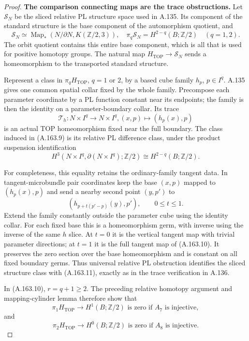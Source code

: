 \begin{proof}
\textbf{The comparison connecting maps are the trace obstructions.}
Let $\mathcal S_N$ be the sliced relative PL structure space used in
A.135. Its component of the standard structure is the base component
of the automorphism quotient, and
\[
 \mathcal S_N\simeq
 \operatorname{Map}_*(N/\partial N,K(\mathbb Z/2,3)),
 \quad \pi_q\mathcal S_N=H^{2-q}(B;\mathbb Z/2)
 \quad(q=1,2).                                                     \tag{A.163.9}
\]
The orbit quotient contains this entire base component, which is all
that is used for positive homotopy groups. The natural map
$H_{\mathrm{TOP}}\to\mathcal S_N$ sends a homeomorphism to the
transported standard structure.

Represent a class in $\pi_qH_{\mathrm{TOP}}$, $q=1$ or $2$, by a based
cube family $h_p$, $p\in I^q$. A.135 gives one common spatial collar
fixed by the whole family. Precompose each parameter coordinate by
a PL function constant near its endpoints; the family is then the
identity on a parameter-boundary collar. Its trace
\[
 \mathcal T_h:N\times I^q\longrightarrow N\times I^q,
                 (x,p)\longmapsto(h_p(x),p)                        \tag{A.163.10}
\]
is an actual TOP homeomorphism fixed near the full boundary. The
class induced in (A.163.9) is its relative PL difference class, under
the product suspension identification
\[
 H^3(N\times I^q,\partial(N\times I^q);\mathbb Z/2)
                         \cong H^{2-q}(B;\mathbb Z/2).             \tag{A.163.11}
\]

For completeness, this equality retains the ordinary-family tangent
data. In tangent-microbundle pair coordinates keep the base $(x,p)$
mapped to $(h_p(x),p)$ and send a nearby second point $(y,p')$ to
\[
                (h_{p+t(p'-p)}(y),p'),\qquad 0\le t\le1.
\]
Extend the family constantly outside the parameter cube using the
identity collar. For each fixed base this is a homeomorphism germ,
with inverse using the inverse of the same $h$ slice. At $t=0$ it
is the vertical tangent map with trivial parameter directions; at
$t=1$ it is the full tangent map of (A.163.10). It preserves the zero
section over the base homeomorphism and is constant on all fixed
boundary germs. Thus universal relative PL obstruction identifies
the sliced structure class with (A.163.11), exactly as in the trace
verification in A.136.

In (A.163.10), $r=q+1\ge2$. The preceding relative homotopy argument and
mapping-cylinder lemma therefore show that
\[
 \pi_1H_{\mathrm{TOP}}\longrightarrow H^1(B;\mathbb Z/2)
       \text{ is zero if }A_7\text{ is injective},                 \tag{A.163.12}
\]
and
\[
 \pi_2H_{\mathrm{TOP}}\longrightarrow H^0(B;\mathbb Z/2)
       \text{ is zero if }A_8\text{ is injective}.                 \tag{A.163.13}
\]


\end{proof}
